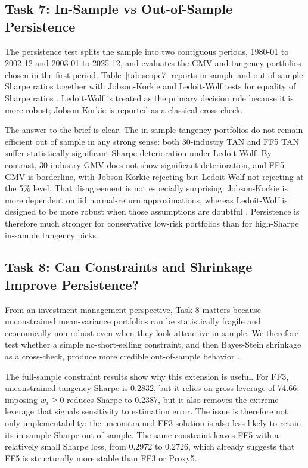 \documentclass[11pt,a4paper]{article}
\begin{document}
\subsection{Task 7: In-Sample vs Out-of-Sample Persistence}
The persistence test splits the sample into two contiguous periods, 1980-01 to 2002-12 and 2003-01 to 2025-12, and evaluates the GMV and tangency portfolios chosen in the first period. Table~\ref{tab:scope7} reports in-sample and out-of-sample Sharpe ratios together with Jobson-Korkie and Ledoit-Wolf tests for equality of Sharpe ratios \parencite{JobsonKorkie1981,LedoitWolf2008}. Ledoit-Wolf is treated as the primary decision rule because it is more robust; Jobson-Korkie is reported as a classical cross-check.

\begin{table}[H]
\centering
\caption{Task 7: persistence of selected in-sample portfolios}
\label{tab:scope7}
\small
\resizebox{\textwidth}{!}{}
\end{table}

The answer to the brief is clear. The in-sample tangency portfolios do not remain efficient out of sample in any strong sense: both 30-industry TAN and FF5 TAN suffer statistically significant Sharpe deterioration under Ledoit-Wolf. By contrast, 30-industry GMV does not show significant deterioration, and FF5 GMV is borderline, with Jobson-Korkie rejecting but Ledoit-Wolf not rejecting at the 5\% level. That disagreement is not especially surprising: Jobson-Korkie is more dependent on iid normal-return approximations, whereas Ledoit-Wolf is designed to be more robust when those assumptions are doubtful \parencite{JobsonKorkie1981,LedoitWolf2008}. Persistence is therefore much stronger for conservative low-risk portfolios than for high-Sharpe in-sample tangency picks.

\subsection{Task 8: Can Constraints and Shrinkage Improve Persistence?}
From an investment-management perspective, Task 8 matters because unconstrained mean-variance portfolios can be statistically fragile and economically non-robust even when they look attractive in sample. We therefore test whether a simple no-short-selling constraint, and then Bayes-Stein shrinkage as a cross-check, produce more credible out-of-sample behavior \parencite{jagannathan2003}.

The full-sample constraint results show why this extension is useful. For FF3, unconstrained tangency Sharpe is 0.2832, but it relies on gross leverage of 74.66; imposing $w_i \geq 0$ reduces Sharpe to 0.2387, but it also removes the extreme leverage that signals sensitivity to estimation error. The issue is therefore not only implementability: the unconstrained FF3 solution is also less likely to retain its in-sample Sharpe out of sample. The same constraint leaves FF5 with a relatively small Sharpe loss, from 0.2972 to 0.2726, which already suggests that FF5 is structurally more stable than FF3 or Proxy5.
\end{document}
